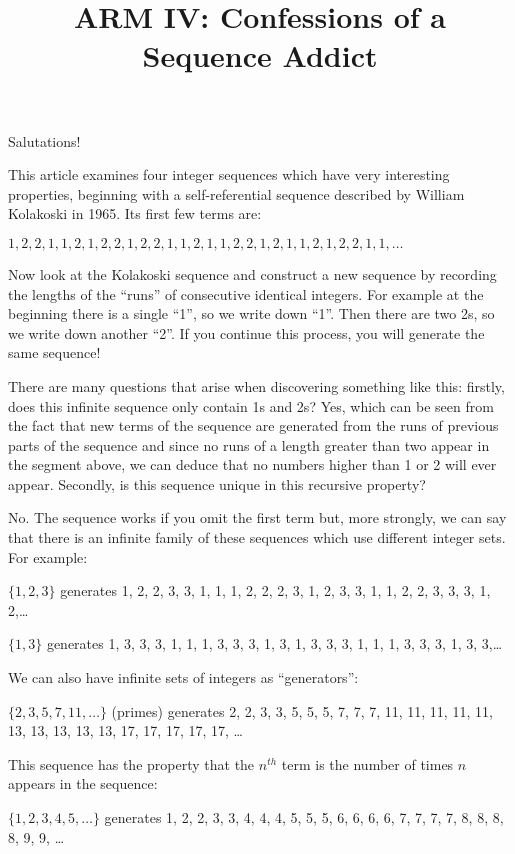 \documentclass[titlepage,a4paper]{article}
\begin{document}
\title{ARM IV: Confessions of a Sequence Addict}
\maketitle

Salutations!

This article examines four integer sequences which have very interesting properties, beginning with a self-referential sequence described by William Kolakoski in 1965. Its first few terms are: \par
\(1, 2, 2, 1, 1, 2, 1, 2, 2, 1, 2, 2, 1, 1, 2, 1, 1, 2, 2, 1, 2, 1, 1, 2, 1, 2, 2, 1, 1,\ldots\) \par
Now look at the Kolakoski sequence and construct a new sequence by recording the lengths of the “runs” of consecutive identical integers. For example at the beginning there is a single “1”, so we write down “1”. Then there are two 2s, so we write down another “2”. If you continue this process, you will generate the same sequence! \par
There are many questions that arise when discovering something like this: firstly, does this infinite sequence only contain 1s and 2s? Yes, which can be seen from the fact that new terms of the sequence are generated from the runs of previous parts of the sequence and since no runs of a length greater than two appear in the segment above, we can deduce that no numbers higher than 1 or 2 will ever appear. Secondly, is this sequence unique in this recursive property? \par
No. The sequence works if you omit the first term but, more strongly, we can say that there is an infinite family of these sequences which use different integer sets. For example:\par

\(\{1, 2, 3\}\) generates 1, 2, 2, 3, 3, 1, 1, 1, 2, 2, 2, 3, 1, 2, 3, 3, 1, 1, 2, 2, 3, 3, 3, 1, 2,\ldots

\(\{1, 3\}\) generates 1, 3, 3, 3, 1, 1, 1, 3, 3, 3, 1, 3, 1, 3, 3, 3, 1, 1, 1, 3, 3, 3, 1, 3, 3,\ldots

We can also have infinite sets of integers as “generators”: \par

\(\{2, 3, 5, 7, 11,\ldots\}\) (primes) generates 2, 2, 3, 3, 5, 5, 5, 7, 7, 7, 11, 11, 11, 11, 11, 13, 13, 13, 13, 13, 17, 17, 17, 17, 17, \ldots

This sequence has the property that the \(n^{th}\) term is the number of times \(n\) appears in the sequence: \par
\(\{1, 2, 3, 4, 5,\ldots\}\) generates 1, 2, 2, 3, 3, 4, 4, 4, 5, 5, 5, 6, 6, 6, 6, 7, 7, 7, 7, 8, 8, 8, 8, 9, 9, \ldots
\end{document}
